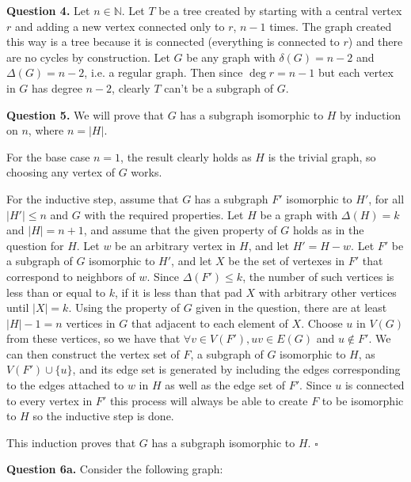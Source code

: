 \documentclass[letterpaper, reqno,11pt]{article}
\begin{document}
{\medskip\noindent\bf Question 4.} Let $n\in \mathbb{N}$. Let $T$ be a tree created by starting with a central vertex $r$ and adding a new vertex connected only to $r$, $n-1$ times. The graph created this way is a tree because it is connected (everything is connected to $r$) and there are no cycles by construction. Let $G$ be any graph with $\delta(G)=n-2$ and $\Delta(G)=n-2$, i.e. a regular graph. Then since $\deg r=n-1$ but each vertex in $G$ has degree $n-2$, clearly $T$ can't be a subgraph of $G$. 


{\medskip\noindent\bf Question 5.} We will prove that $G$ has a subgraph isomorphic to $H$ by induction on $n$, where $n=|H|$. 

For the base case $n=1$, the result clearly holds as $H$ is the trivial graph, so choosing any vertex of $G$ works. 

For the inductive step, assume that $G$ has a subgraph $F'$ isomorphic to $H'$, for all $|H'|\leq n$ and $G$ with the required properties. Let $H$ be a graph with $\Delta(H)=k$ and $|H|=n+1$, and assume that the given property of $G$ holds as in the question for $H$. Let $w$ be an arbitrary vertex in $H$, and let $H'=H-w$. Let $F'$ be a subgraph of $G$ isomorphic to $H'$, and let $X$ be the set of vertexes in $F'$ that correspond to neighbors of $w$. Since $\Delta(F')\leq k$, the number of such vertices is less than or equal to $k$, if it is less than that pad $X$ with arbitrary other vertices until $|X|=k$. Using the property of $G$ given in the question, there are at least $|H|-1=n$ vertices in $G$ that adjacent to each element of $X$. Choose $u$ in $V(G)$ from these vertices, so we have that $\forall v\in V(F'), uv\in E(G)$ and $u \not\in F'$. We can then construct the vertex set of $F$, a subgraph of $G$ isomorphic to $H$, as $V(F')\cup \{u\}$, and its edge set is generated by including the edges corresponding to the edges attached to $w$ in $H$ as well as the edge set of $F'$. Since $u$ is connected to every vertex in $F'$ this process will always be able to create $F$ to be isomorphic to $H$ so the inductive step is done. 

This induction proves that $G$ has a subgraph isomorphic to $H$. $\square$

{\medskip\noindent\bf Question 6a.} Consider the following graph:

\begin{center}
\end{center}
\end{document}
